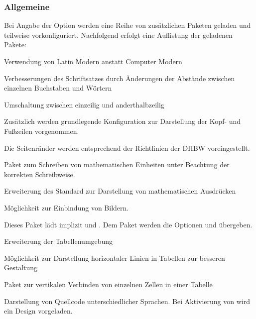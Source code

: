 \documentclass[babel=ngerman,highlight=false]{skdoc}
\begin{document}
            \subsubsection{Allgemeine}
                Bei Angabe der Option  werden eine Reihe von zusätzlichen Paketen geladen und teilweise vorkonfiguriert. Nachfolgend erfolgt eine Auflistung der geladenen Pakete:
                \begin{description}[itemsep=1pt, style=multiline, leftmargin=3cm]
                    \item [\pkg{lmodern}] Verwendung von Latin Modern anstatt Computer Modern
                    \item [\pkg{microtype}] Verbesserungen des Schriftsatzes durch Änderungen der Abstände zwischen einzelnen Buchstaben und Wörtern
                    \item [\pkg{setspace}] Umschaltung zwischen einzeilig und anderthalbzeilig
                    \item [\pkg{scrlayer-srcpage}] Zusätzlich werden grundlegende Konfiguration zur Darstellung der Kopf- und Fußzeilen vorgenommen.
                    \item [\pkg{geometry}] Die Seitenränder werden entsprechend der Richtlinien der DHBW voreingestellt.
                    \item [\pkg{siunitx}] Paket zum Schreiben von mathematischen Einheiten unter Beachtung der korrekten Schreibweise.
                    \item [\pkg{mathtools}] Erweiterung des Standard zur Darstellung von mathematischen Ausdrücken
                    \item [\pkg{graphicx}] Möglichkeit zur Einbindung von Bildern.
                    \item [\pkg{tcolobox}] Dieses Paket lädt implizit  und . Dem Paket  werden die Optionen  und  übergeben.
                    \item [\pkg{tabularx}] Erweiterung der Tabellenumgebung
                    \item [\pkg{booktabs}] Möglichkeit zur Darstellung horizontaler Linien in Tabellen zur besseren Gestaltung
                    \item [\pkg{multirow}] Paket zur vertikalen Verbinden von einzelnen Zellen in einer Tabelle
                    \item [\pkg{listings}] Darstellung von Quellcode unterschiedlicher Sprachen. Bei Aktivierung von  wird ein Design vorgeladen.
                \end{description}
                
\end{document}
